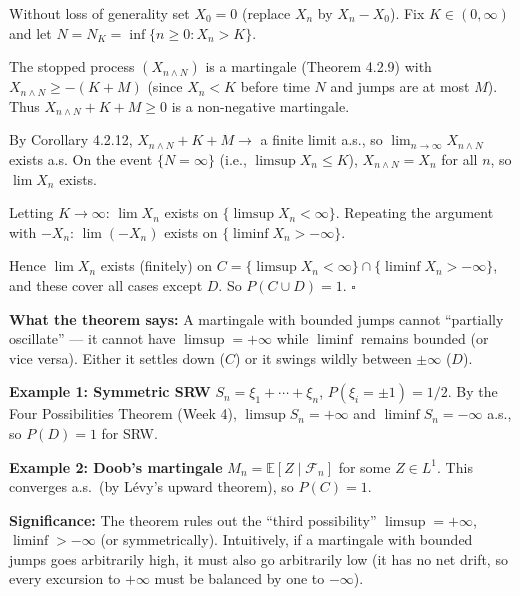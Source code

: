 \documentclass[12pt]{article}
\newcommand{\E}{\mathbb{E}}
\newcommand{\F}{\mathcal{F}}
\newcommand{\1}{\mathbf{1}}
\begin{document}
\begin{tcolorbox}[redbox={Proof of Theorem 4.3.1}]
Without loss of generality set $X_0 = 0$ (replace $X_n$ by $X_n - X_0$).
Fix $K \in (0, \infty)$ and let $N = N_K = \inf\{n \ge 0: X_n > K\}$.

The stopped process $(X_{n \wedge N})$ is a martingale (Theorem 4.2.9) with
$X_{n \wedge N} \ge -(K + M)$ (since $X_n < K$ before time $N$ and jumps are at
most $M$).  Thus $X_{n \wedge N} + K + M \ge 0$ is a non-negative martingale.

By Corollary 4.2.12, $X_{n \wedge N} + K + M \to$ a finite limit a.s., so
$\lim_{n \to \infty} X_{n \wedge N}$ exists a.s.  On the event $\{N = \infty\}$
(i.e., $\limsup X_n \le K$), $X_{n \wedge N} = X_n$ for all $n$, so $\lim X_n$ exists.

Letting $K \to \infty$: $\lim X_n$ exists on $\{\limsup X_n < \infty\}$.
Repeating the argument with $-X_n$: $\lim (-X_n)$ exists on $\{\liminf X_n > -\infty\}$.

Hence $\lim X_n$ exists (finitely) on $C = \{\limsup X_n < \infty\} \cap \{\liminf X_n > -\infty\}$,
and these cover all cases except $D$.  So $P(C \cup D) = 1$. \hfill$\square$
\end{tcolorbox}

\begin{tcolorbox}[bluebox={Intuition and Examples}]
\textbf{What the theorem says:} A martingale with bounded jumps cannot ``partially
oscillate'' --- it cannot have $\limsup = +\infty$ while $\liminf$ remains bounded
(or vice versa).  Either it settles down ($C$) or it swings wildly between $\pm\infty$
($D$).

\medskip
\textbf{Example 1: Symmetric SRW} $S_n = \xi_1 + \cdots + \xi_n$, $P(\xi_i = \pm 1) = 1/2$.
By the Four Possibilities Theorem (Week 4), $\limsup S_n = +\infty$ and $\liminf S_n = -\infty$
a.s., so $P(D) = 1$ for SRW.

\medskip
\textbf{Example 2: Doob's martingale} $M_n = \E[Z \mid \F_n]$ for some $Z \in L^1$.
This converges a.s.\ (by L\'evy's upward theorem), so $P(C) = 1$.

\medskip
\textbf{Significance:} The theorem rules out the ``third possibility''
$\limsup = +\infty$, $\liminf > -\infty$ (or symmetrically).  Intuitively, if a
martingale with bounded jumps goes arbitrarily high, it must also go arbitrarily low
(it has no net drift, so every excursion to $+\infty$ must be balanced by one to $-\infty$).
\end{tcolorbox}
\end{document}
